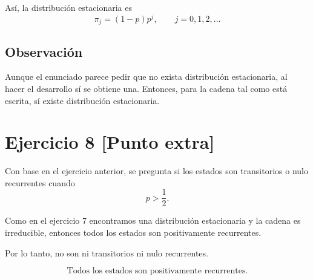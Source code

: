 \documentclass[12pt]{article}
\begin{document}
Así, la distribución estacionaria es
\[
\boxed{\pi_j=(1-p)p^j,\qquad j=0,1,2,\dots}
\]

\subsection*{Observación}

Aunque el enunciado parece pedir que no exista distribución estacionaria, al hacer el desarrollo sí se obtiene una. Entonces, para la cadena tal como está escrita, sí existe distribución estacionaria.

\newpage
\section*{Ejercicio 8 [Punto extra]}

Con base en el ejercicio anterior, se pregunta si los estados son transitorios o nulo recurrentes cuando
\[
p>\frac12.
\]

Como en el ejercicio 7 encontramos una distribución estacionaria y la cadena es irreducible, entonces todos los estados son positivamente recurrentes.

Por lo tanto, no son ni transitorios ni nulo recurrentes.

\[
\boxed{\text{Todos los estados son positivamente recurrentes.}}
\]
\end{document}
